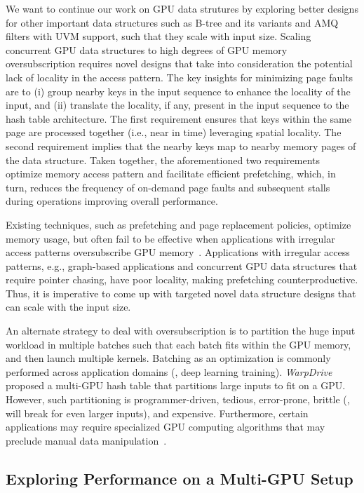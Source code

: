 \documentclass[12pt,a4paper]{article}
\begin{document}
We want to continue our work on GPU data strutures by exploring better designs for other important data structures such as B-tree and its variants and AMQ filters with UVM support, such that they scale with input size.
Scaling concurrent GPU data structures to high degrees of GPU memory
oversubscription requires novel designs that take into consideration the
potential lack of locality in the access pattern. The key insights for
minimizing page faults are to (i) group nearby keys in the input sequence to
enhance the locality of the input, and (ii) translate the locality, if any,
present in the input sequence to the hash table architecture. The first
requirement ensures that keys within the same page are processed together (i.e.,
near in time) leveraging spatial locality. The second requirement implies that
the nearby keys map to nearby memory pages of the data structure. Taken together, the aforementioned two
requirements optimize memory access pattern and facilitate efficient
prefetching, which, in turn, reduces the frequency of on-demand page faults and
subsequent stalls during operations improving overall performance.

Existing techniques, such as prefetching and page replacement policies, optimize
memory usage, but often fail to be effective when applications with irregular
access patterns oversubscribe GPU
memory~\cite{uvm-forest-isca25,uvmsmart-isca-2019,cppe-ipdps-2020,hpe-tcad-2020}.
Applications with irregular access patterns, e.g., graph-based applications and
concurrent GPU data structures that require pointer chasing, have poor locality,
making prefetching counterproductive. Thus, it is imperative to come up with
targeted novel data structure designs that can scale with the input size.

An alternate strategy to deal with oversubscription is to partition the huge
input workload in multiple batches such that each batch fits within the GPU
memory, and then launch multiple kernels. Batching as an optimization is
commonly performed across application domains (\eg, deep learning training).
\emph{WarpDrive}~\cite{warpdrive} proposed a multi-GPU hash table that
partitions large inputs to fit on a GPU. However, such partitioning is
programmer-driven, tedious, error-prone, brittle (\ie, will break for even
larger inputs), and expensive. Furthermore, certain applications may require
specialized GPU computing algorithms that may preclude manual data
manipulation~\cite{perks-isc-2023}.

\subsection*{Exploring Performance on a Multi-GPU Setup}
\end{document}

